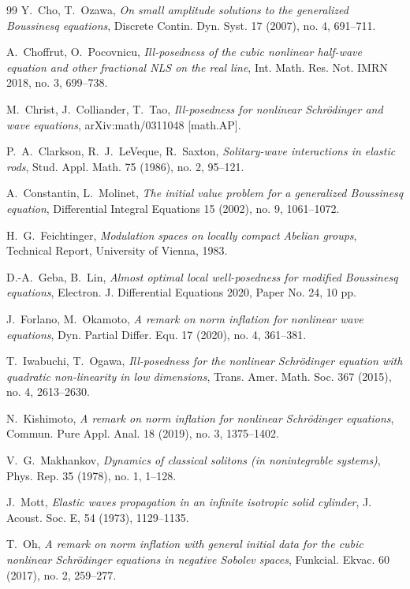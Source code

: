 \documentclass[letterpaper, 11pt,  reqno]{amsart}
\newcommand{\1}{\hspace{0.5mm}\text{I}\hspace{0.5mm}}
\numberwithin{equation}{section}
\numberwithin{theorem}{section}
\begin{document}
\begin{thebibliography}{99}
Y.~Cho, T.~Ozawa,
{\it On small amplitude solutions to the generalized Boussinesq equations},
Discrete Contin. Dyn. Syst. 17 (2007), no. 4, 691–711.

A.~Choffrut, O.~Pocovnicu, 
{\it Ill-posedness of the cubic nonlinear half-wave equation and other fractional NLS on the real line},
Int. Math. Res. Not. IMRN 2018, no. 3, 699–738.

M.~Christ, J.~Colliander, T.~Tao, 
{\it Ill-posedness for nonlinear Schr\"odinger and wave equations}, 
arXiv:math/0311048 [math.AP].

P.~A.~Clarkson, R.~J.~LeVeque, R.~Saxton,
{\it Solitary-wave interactions in elastic rods},
Stud. Appl. Math. 75 (1986), no. 2, 95–121.

A.~Constantin, L.~Molinet,
{\it The initial value problem for a generalized Boussinesq equation},
Differential Integral Equations 15 (2002), no. 9, 1061–1072.


H.~G.~Feichtinger,
{\it Modulation spaces on locally compact Abelian groups},
Technical Report, University of Vienna, 1983.

D.-A.~Geba, B.~Lin,
{\it Almost optimal local well-posedness for modified Boussinesq equations},
Electron. J. Differential Equations 2020, Paper No. 24, 10 pp.

J.~Forlano, M.~Okamoto, 
{\it A remark on norm inflation for nonlinear wave equations},
Dyn. Partial Differ. Equ. 17 (2020), no. 4, 361–381.

T.~Iwabuchi, T.~Ogawa, 
{\it Ill-posedness for the nonlinear Schrödinger equation with quadratic non-linearity in low dimensions},
Trans. Amer. Math. Soc. 367 (2015), no. 4, 2613–2630.

N.~Kishimoto,
{\it A remark on norm inflation for nonlinear Schrödinger equations},
Commun. Pure Appl. Anal. 18 (2019), no. 3, 1375–1402.

V.~G.~Makhankov, 
{\it Dynamics of classical solitons (in nonintegrable systems)},
Phys. Rep. 35 (1978), no. 1, 1–128.

J.~Mott, 
{\it Elastic waves propagation in an infinite isotropic solid cylinder}, 
J. Acoust. Soc. E, 54 (1973), 1129--1135.

T.~Oh, 
{\it A remark on norm inflation with general initial data for the cubic nonlinear Schrödinger equations in negative Sobolev spaces},
Funkcial. Ekvac. 60 (2017), no. 2, 259–277.


\end{thebibliography}
\end{document}
